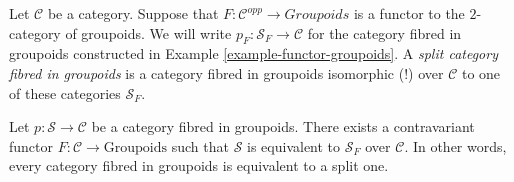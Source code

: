 \begin{definition}
\label{definition-split-category-fibred-in-groupoids}
Let $\mathcal{C}$ be a category.
Suppose that $F : \mathcal{C}^{opp} \to \textit{Groupoids}$ is a functor
to the $2$-category of groupoids.
We will write $p_F : \mathcal{S}_F \to \mathcal{C}$ for the
category fibred in groupoids constructed in
Example \ref{example-functor-groupoids}.
A {\it split category fibred in groupoids} is a
category fibred in groupoids isomorphic (!)
over $\mathcal{C}$ to one of these categories {\it $\mathcal{S}_F$}.
\end{definition}

\begin{lemma}
\label{lemma-fibred-groupoids-strict}
Let $ p : \mathcal{S} \to \mathcal{C}$ be a category fibred in groupoids.
There exists a contravariant functor $F : \mathcal{C} \to \text{Groupoids}$
such that $\mathcal{S}$ is equivalent to $\mathcal{S}_F$ over $\mathcal{C}$.
In other words, every category fibred in groupoids is equivalent to a split one.
\end{lemma}

